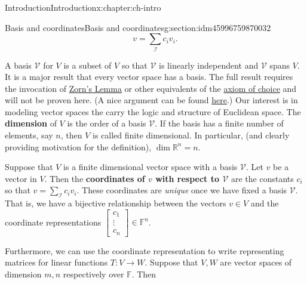 \documentclass[oneside,10pt,]{book}
\newcommand{\terminology}[1]{\textbf{#1}}
\numberwithin{equation}{section}
\newcommand{\F}{\mathbb{F}}
\newcommand{\R}{\mathbb{R}}
\newcommand\bbm{\begin{bmatrix}}
\newcommand\ebm{\end{bmatrix}}
\numberwithin{equation}{section}
\begin{document}
\begin{chapterptx}{Introduction}{}{Introduction}{}{}{x:chapter:ch-intro}
\begin{sectionptx}{Basis and coordinates}{}{Basis and coordinates}{}{}{g:section:idm45996759870032}
\begin{equation*}
v = \sum_{\mathcal I} c_i v_i.
\end{equation*}
%
\par
A basis \(\mathcal V\) for \(V\) is a subset of \(V\) so that \(\mathcal V\) is linearly independent and \(\mathcal V\) spans \(V\). It is a major result that every vector space has a basis. The full result requires the invocation of \href{https://en.wikipedia.org/wiki/Zorn\%27s_lemma}{Zorn's Lemma} or other equivalents of the \href{https://en.wikipedia.org/wiki/Axiom_of_choice}{axiom of choice} and will not be proven here. (A nice argument can be found \href{http://www.math.lsa.umich.edu/\~kesmith/infinite.pdf}{here}.) Our interest is in modeling vector spaces the carry the logic and structure of Euclidean space. The \terminology{dimension} of \(V\) is the order of a basis \(\mathcal V\). If the basis has a finite number of elements, say \(n\), then \(V\) is called finite dimensional. In particular, (and clearly providing motivation for the definition), \(\dim \R^n = n\).%
\par
Suppose that \(V\) is a finite dimensional vector space with a basis \(\mathcal V\). Let \(v\) be a vector in \(V\). Then the \terminology{coordinates of \(v\) with respect to \(\mathcal V\)} are the constants \(c_i\) so that \(v = \sum_{\mathcal I} c_i v_i\). These coordinates are \emph{unique} once we have fixed a basis \(\mathcal V\). That is, we have a bijective relationship between the vectors \(v \in V\) and the coordinate representations \(\bbm c_1 \\ \vdots \\ c_n \ebm \in \F^n\).%
\par
Furthermore, we can use the coordinate representation to write representing matrices for linear functions \(T:V \to W\). Suppose that \(V, W\) are vector spaces of dimension \(m,n\) respectively over \(\F\). Then \begin{image}{0}{1}{0}%
%
\end{image}%
%
\end{sectionptx}
\end{chapterptx}
\end{document}
